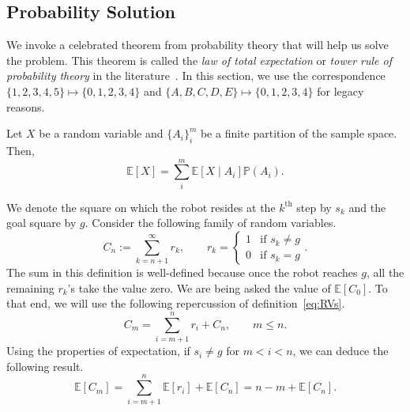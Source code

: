 \subsection{Probability Solution}
\label{ssec:prob_sol}
%
We invoke a celebrated theorem from probability theory that will help us solve
the problem. This theorem is called the \textit{law of total expectation} or
\textit{tower rule of probability theory} in the
literature~\cite{bertsekas2002introduction}.
%
In this section, we use the correspondence $\{1, 2, 3, 4, 5\} \mapsto \{0, 1, 2,
3, 4\}$ and $\{A, B, C, D, E\} \mapsto \{0, 1, 2, 3, 4\}$ for legacy reasons.
%
\begin{thm} \label{thm:tower} Let $X$ be a random variable and
    $\{A_i\}_i^m$ be a finite partition of the sample space. Then, 
    \[ \mathbb{E}[X] = \sum_i^m \mathbb{E}\left[ X \mid A_i \right]
    \mathbb{P}(A_i). \]
\end{thm}
%
We denote the square on which the robot resides at the $k^{\text{th}}$ step by
$s_k$ and the goal square by $g$. Consider the following family of random
variables.
\begin{equation}
    C_n := \sum_{k=n+1}^\infty r_k, \qquad r_k = 
\begin{cases}
    1 & \mbox{if } s_k \neq g \\
    0 & \mbox{if } s_k = g
\end{cases}.
\label{eq:RVs}
\end{equation}
%
The sum in this definition is well-defined because once the robot reaches $g$,
all the remaining $r_k$'s take the value zero. We are being asked the value of
$\mathbb{E}[C_0]$. To that end, we will use the following repercussion of
definition~\eqref{eq:RVs}.
\begin{equation*} 
    C_m = \sum_{i=m+1}^n r_i + C_n, \qquad m \leq n.
\end{equation*}
Using the properties of expectation, if $s_i \neq g$ for $m < i < n$, we can
deduce the following result.
\begin{equation*} 
    \mathbb{E}[C_m] = \sum_{i=m+1}^n \mathbb{E}[r_i] + \mathbb{E}[C_n] = n-m + \mathbb{E}[C_n].
\end{equation*}
